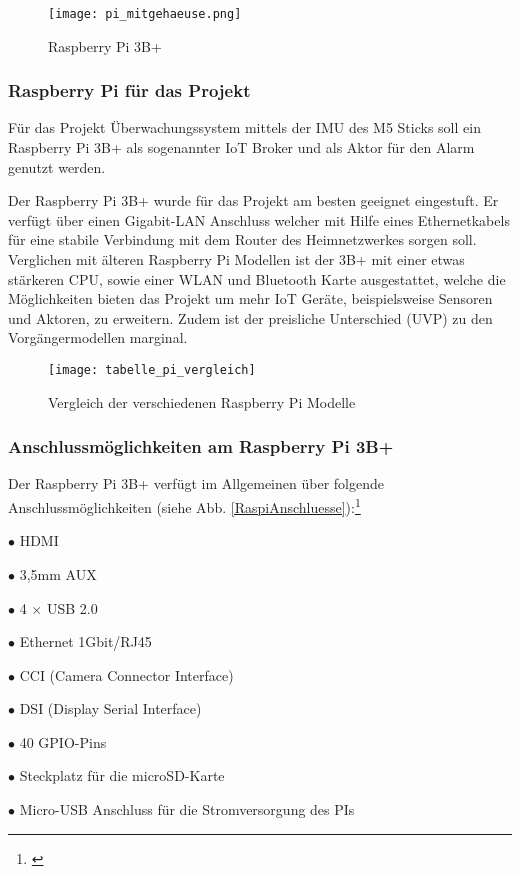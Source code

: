 \documentclass[a4paper,12pt]{article}
\begin{document}
	\begin{figure}[H]
	\centering
	\texttt{[image: pi\_mitgehaeuse.png]}
	\caption{Raspberry Pi 3B+}
	\label{pi_mitgehaeuse}
\end{figure}	

\subsubsection{Raspberry Pi für das Projekt}
Für das Projekt Überwachungssystem mittels der IMU des M5 Sticks soll ein 
Raspberry Pi 3B+ als sogenannter IoT Broker und als Aktor für den Alarm genutzt werden.\par
Der Raspberry Pi 3B+ wurde für das Projekt am besten geeignet eingestuft. Er verfügt über einen Gigabit-LAN Anschluss welcher mit Hilfe eines Ethernetkabels für eine stabile Verbindung mit dem Router des Heimnetzwerkes sorgen soll. Verglichen mit älteren Raspberry Pi Modellen ist der 3B+ mit einer etwas stärkeren CPU, sowie einer WLAN und Bluetooth Karte ausgestattet, welche die Möglichkeiten bieten das Projekt um mehr IoT Geräte, beispielsweise Sensoren und Aktoren, zu erweitern. Zudem ist der preisliche Unterschied (UVP) zu den Vorgängermodellen marginal.  

	\begin{figure}[H]
	\centering
	\texttt{[image: tabelle\_pi\_vergleich]}
	\caption{Vergleich der verschiedenen Raspberry Pi Modelle \protect\cite[S. 59]{Huwe.2019}}
	\label{tabelle_pi_vergleich}
\end{figure}

\subsubsection{Anschlussmöglichkeiten am Raspberry Pi 3B+}
Der Raspberry Pi 3B+ verfügt im Allgemeinen über folgende Anschlussmöglichkeiten (siehe Abb. \ref{RaspiAnschluesse}):\footnote{\cite[S. 60]{Huwe.2019}}\par 
$\bullet$ HDMI   \par %
$\bullet$ 3,5mm AUX\par 
$\bullet$ 4 $\times$ USB 2.0 \par 
$\bullet$ Ethernet 1Gbit/RJ45\par 
$\bullet$ CCI (Camera Connector Interface)\par 
$\bullet$ DSI (Display Serial Interface)\par
$\bullet$ 40 GPIO-Pins\par
$\bullet$ Steckplatz für die microSD-Karte\par
$\bullet$ Micro-USB Anschluss für die Stromversorgung des PIs\par
\end{document}
